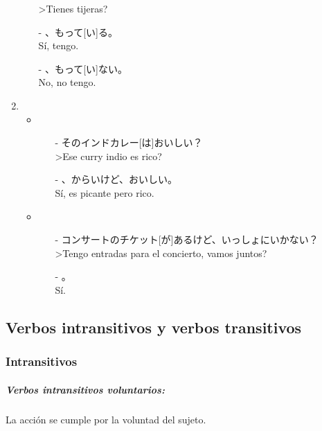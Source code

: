 \documentclass[a4paper,12pt,oneside]{report}
\begin{document}
\begin{CJK*}{UTF8}{min}
\begin{enumerate}
\begin{itemize}
                       >Tienes tijeras?
              \item[-] 、もって[い]る。\\
                       S\'i, tengo.
              \item[-] 、もって[い]ない。\\
                       No, no tengo.
            \end{itemize}
          \item
            \begin{itemize}
              \item
                \begin{itemize}
                  \item[-] そのインドカレー[は]おいしい？\\
                           >Ese curry indio es rico?
                  \item[-] 、からいけど、おいしい。\\
                           S\'i, es picante pero rico.
                \end{itemize}
              \item
                \begin{itemize}
                  \item[-] コンサートのチケット[が]あるけど、いっしょにいかない？\\
                           >Tengo entradas para el concierto, vamos juntos?
                  \item[-] 。\\
                           S\'i.
                \end{itemize}
            \end{itemize}
        \end{enumerate}

      \subsection{Verbos intransitivos y verbos transitivos}

        \subsubsection{Intransitivos}

          \subparagraph{Verbos intransitivos voluntarios:}

            La acción se cumple por la voluntad del sujeto.


\end{CJK*}
\end{document}
